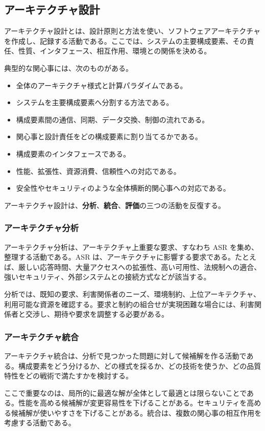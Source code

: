 \documentclass[a4paper,11pt]{ltjsarticle}
\newcommand{\keyterm}[1]{\textbf{#1}}
\begin{document}
\subsection{アーキテクチャ設計}
アーキテクチャ設計とは、設計原則と方法を使い、ソフトウェアアーキテクチャを作成し、記録する活動である。ここでは、システムの主要構成要素、その責任、性質、インタフェース、相互作用、環境との関係を決める。

典型的な関心事には、次のものがある。
\begin{itemize}
  \item 全体のアーキテクチャ様式と計算パラダイムである。
  \item システムを主要構成要素へ分割する方法である。
  \item 構成要素間の通信、同期、データ交換、制御の流れである。
  \item 関心事と設計責任をどの構成要素に割り当てるかである。
  \item 構成要素のインタフェースである。
  \item 性能、拡張性、資源消費、信頼性への対応である。
  \item 安全性やセキュリティのような全体横断的関心事への対応である。
\end{itemize}

アーキテクチャ設計は、\keyterm{分析}、\keyterm{統合}、\keyterm{評価}の三つの活動を反復する。

\subsubsection{アーキテクチャ分析}
アーキテクチャ分析は、アーキテクチャ上重要な要求、すなわち ASR を集め、整理する活動である。ASR は、アーキテクチャに影響する要求である。たとえば、厳しい応答時間、大量アクセスへの拡張性、高い可用性、法規制への適合、強いセキュリティ、外部システムとの接続方式などが該当する。

分析では、既知の要求、利害関係者のニーズ、環境制約、上位アーキテクチャ、利用可能な資源を確認する。要求と制約の組合せが実現困難な場合には、利害関係者と交渉し、期待や要求を調整する必要がある。

\subsubsection{アーキテクチャ統合}
アーキテクチャ統合は、分析で見つかった問題に対して候補解を作る活動である。構成要素をどう分けるか、どの様式を採るか、どの技術を使うか、どの品質特性をどの戦術で満たすかを検討する。

ここで重要なのは、局所的に最適な解が全体として最適とは限らないことである。性能を高める候補解が変更容易性を下げることがある。セキュリティを高める候補解が使いやすさを下げることがある。統合は、複数の関心事の相互作用を考慮する活動である。
\end{document}
